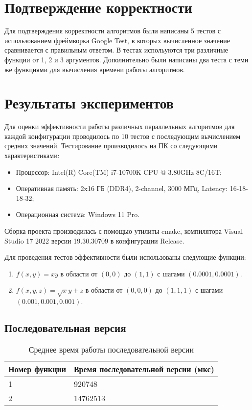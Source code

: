 \documentclass{report}
\begin{document}
\clearpage

\section*{Подтверждение корректности}

\par Для подтверждения корректности алгоритмов были написаны 5 тестов с использованием фреймворка Google Test, в которых вычисленное значение сравнивается с правильным ответом. В тестах испольуются три различные функции от 1, 2 и 3 аргументов. Дополнительно были написаны два теста с теми же функциями для вычисления времени работы алгоритмов.

\clearpage

\section*{Результаты экспериментов}

\par Для оценки эффективности работы различных параллельных алгоритмов для каждой конфигурации проводилось по 10 тестов с последующим вычислением средних значений. Тестирование производилось на ПК со следующими характеристиками:
\begin{itemize}
\item Процессор: Intel(R) Core(TM) i7-10700K CPU @ 3.80GHz 8C/16T;
\item Оперативная память: 2x16 ГБ (DDR4), 2-channel, 3000 МГц, Latency: 16-18-18-32;
\item Операционная система: Windows 11 Pro.
\end{itemize}
\par Сборка проекта производилась с помощью утилиты cmake, компилятора Visual Studio 17 2022 версии 19.30.30709 в конфигурации Release.

\par Для проведения тестов эффективности были использованы следующие функции:
\begin{enumerate}
  \item \(f(x,y)=xy\) в области от \((0, 0)\) до \((1, 1)\) с шагами \((0.0001, 0.0001)\).
  \item \(f(x,y,z)=\sqrt{x}y+z\) в области от \((0, 0, 0)\) до \((1, 1, 1)\) с шагами \((0.001, 0.001, 0.001)\).
\end{enumerate}

\subsection*{Последовательная версия}
\begin{table}[H]
  \centering
  \begin{tabularx}{\textwidth}{|X|X|}
    \hline
    Номер функции & Время последовательной версии (мкс) \\
    \hline
    1 & 920748 \\
    2 & 14762513 \\
    \hline
  \end{tabularx}
  \caption{Среднее время работы последовательной версии}
\end{table}
\end{document}
